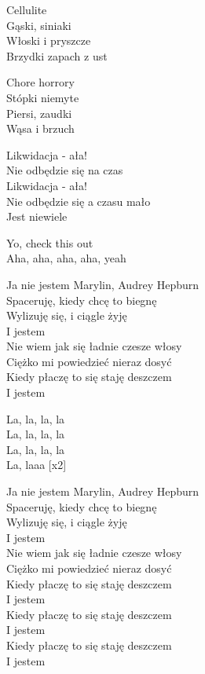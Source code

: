 \begin{text}
    Cellulite\\
    Gąski, siniaki\\
    Włoski i pryszcze\\
    Brzydki zapach z ust

    Chore horrory\\
    Stópki niemyte\\
    Piersi, zaudki\\
    Wąsa i brzuch

    Likwidacja - ała!\\
    Nie odbędzie się na czas\\
    Likwidacja - ała!\\
    Nie odbędzie się a czasu mało\\
    Jest niewiele

    Yo, check this out\\
    Aha, aha, aha, aha, yeah

    Ja nie jestem Marylin, Audrey Hepburn\\
    Spaceruję, kiedy chcę to biegnę\\
    Wylizuję się, i ciągle żyję\\
    I jestem\\
    Nie wiem jak się ładnie czesze włosy\\
    Ciężko mi powiedzieć nieraz dosyć\\
    Kiedy płaczę to się staję deszczem\\
    I jestem

    La, la, la, la\\
    La, la, la, la\\
    La, la, la, la\\
    La, laaa [x2]

    Ja nie jestem Marylin, Audrey Hepburn\\
    Spaceruję, kiedy chcę to biegnę\\
    Wylizuję się, i ciągle żyję\\
    I jestem\\
    Nie wiem jak się ładnie czesze włosy\\
    Ciężko mi powiedzieć nieraz dosyć\\
    Kiedy płaczę to się staję deszczem\\
    I jestem\\
    Kiedy płaczę to się staję deszczem\\
    I jestem\\
    Kiedy płaczę to się staję deszczem\\
    I jestem
\end{text}
\begin{chord}

\end{chord}